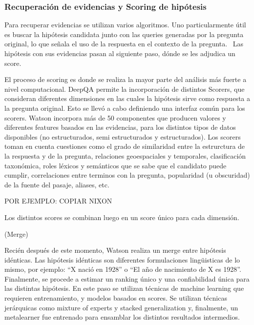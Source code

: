 \bigskip

\subsubsection{Recuperaci\'on de evidencias y Scoring de hip\'otesis}

Para recuperar evidencias se utilizan varios algoritmos. Uno
particularmente \'util es buscar la hip\'otesis candidata junto con las
queries generadas por la pregunta original, lo que se\~nala el uso de
la respuesta en el contexto de la pregunta. \ Las hip\'otesis con sus
evidencias pasan al siguiente paso, d\'onde se les adjudica un score. 

El proceso de scoring es donde se realiza la mayor parte del an\'alisis
m\'as fuerte a nivel computacional. DeepQA permite la incorporaci\'on
de distintos Scorers, que consideran diferentes dimensiones en las
cuales la hip\'otesis sirve como respuesta a la pregunta original. Esto
se llev\'o a cabo definiendo una interfaz com\'un para los scorers.
Watson incorpora m\'as de 50 componentes que producen valores y
diferentes features basados en las evidencias, para los distintos tipos
de datos disponibles (no estructurados, semi estructurados y
estructurados). Los scorers toman en cuenta cuestiones como el grado de
similaridad entre la estrurctura de la respuesta y de la pregunta,
relaciones geoespaciales y temporales, clasificaci\'on taxon\'omica,
roles l\'exicos y sem\'anticos que se sabe que el candidato puede
cumplir, correlaciones entre terminos con la pregunta, popularidad (u
obscuridad) de la fuente del pasaje, aliases, etc.

POR EJEMPLO: COPIAR NIXON

Los distintos scores se combinan luego en un score \'unico para cada
dimensi\'on.

(Merge)

Reci\'en despu\'es de este momento, Watson realiza un merge entre
hip\'otesis id\'enticas. Las hip\'otesis id\'enticas son diferentes
formulaciones ling\"uisticas de lo mismo, por ejemplo:
{\textquotedblleft}X naci\'o en 1928{\textquotedblright} o
{\textquotedblleft}El a\~no de nacimiento de X es
1928{\textquotedblright}. Finalmente, se procede a estimar un ranking
\'unico y una confiabilidad \'unica para las distintas hip\'otesis. En
este paso se utilizan t\'ecnicas de machine learning que requieren
entrenamiento, y modelos basados en scores. Se utilizan t\'ecnicas
jer\'arquicas como mixture of experts y stacked generalization y,
finalmente, un metalearner fue entrenado para ensamblar los distintos
resultados intermedios. 


